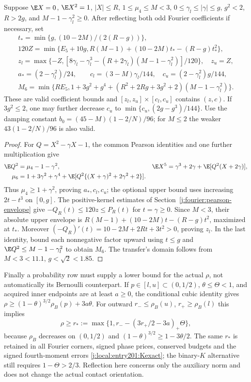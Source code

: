 \begin{proposition}
\label{j:local:paired-rectangle}
Suppose $\E X=0$, $\E X^2=1$, $|X|\le R$, $1\le\mu_4\le M<3$,
$0\le\gamma_l\le|\gamma|\le g$, $g^2<2$, $R>2g$, and
$M-1-\gamma_l^2\ge0$. After reflecting both odd Fourier coefficients
if necessary, set
\begin{gather*}
 t_* =\min\{g,(10-2M)/(2(R-g))\},\\
 120Z=\min\{E_5+10g,R(M-1)+(10-2M)t_*-(R-g)t_*^2\},\\
 z_l=\max\{-Z,[8\gamma_l-\gamma_l^3
        -(R+2\gamma_l)(M-1-\gamma_l^2)]/120\},\quad z_u=Z,\\
 a_*=(2-\gamma_l^2)/24,\qquad
 c_l=(3-M)\gamma_l/144,\quad c_u=(2-\gamma_l^2)g/144,\\
 M_6=\min\{RE_5,1+3g^2+g^4+
 (R^2+2Rg+3g^2+2)(M-1-\gamma_l^2)\}.
\end{gather*}
These are valid coefficient bounds and $[z_l,z_u]\times[c_l,c_u]$
contains $(z,c)$. If $3g^2\le2$, one may further decrease $c_u$ to
$\min\{c_u,(2g-g^3)/144\}$. Use the damping constant
$b_0=(45-M)(1-2/N)/96$; for $M\le2$ the weaker
$43(1-2/N)/96$ is also valid.
\end{proposition}
\begin{proof}
For $Q=X^2-\gamma X-1$, the common Pearson identities and one further
multiplication give
\begin{align}\label{j:local:fourier:pearson}
 \E Q^2&=\mu_4-1-\gamma^2,&
 \E X^5&=\gamma^3+2\gamma+\E[Q^2(X+2\gamma)],\notag\\
 \mu_6&=1+3\gamma^2+\gamma^4+
       \E[Q^2\{(X+\gamma)^2+2\gamma^2+2\}].
\end{align}
Thus $\mu_4\ge1+\gamma^2$, proving $a_*,c_l,c_u$; the optional
upper bound uses increasing $2t-t^3$ on $[0,g]$.
The positive-kernel estimates of Section~\ref{j:fourier:pearson-envelope}
give $-Q_R(t)\le120z\le P_R(t)$ for $t=\gamma\ge0$.
Since $M<3$, their absolute upper envelope is
$R(M-1)+(10-2M)t-(R-g)t^2$, maximized at $t_*$.
Moreover $(-Q_R)'(t)=10-2M+2Rt+3t^2>0$, proving $z_l$.
In the last identity, bound each nonnegative factor upward using
$t\le g$ and $\E Q^2\le M-1-\gamma_l^2$ to obtain $M_6$.
The transfer's domain follows from $M<3<11.1$, $g<\sqrt2<1.85$.
\end{proof}

Finally a probability row must supply a lower bound for the actual
$\rho$, not automatically its Bernoulli counterpart. If
$p\in[l,u]\subset(0,1/2)$, $\theta\le\Theta<1$, and acquired inner
endpoints are at least $a\ge0$, the conditional cubic identity gives
$\rho\ge(1-\theta)^{3/2}\rho_B(p)+3a\theta$.
For outward $r_-\le\rho_B(u)$, $r_+\ge\rho_B(l)$ this implies
\[
 \rho\ge r_*:=\max\{1,r_--(3r_+/2-3a)_+\Theta\},
\]
because $\rho_B$ decreases on $(0,1/2)$ and
$(1-\theta)^{3/2}\ge1-3\theta/2$.
The same $r_*$ is retained in all Fourier corners, signed phase prices,
conserved budgets and the signed fourth-moment errors
\eqref{j:local:entry201:Kexact}; the binary-$K$ alternative still requires
$1-\Theta>2/3$. Reflection here concerns only the auxiliary norm and
does not change the actual contact orientation.

